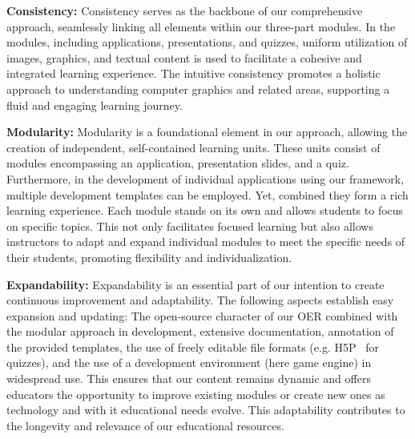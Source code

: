 \textbf{Consistency:}
Consistency serves as the backbone of our comprehensive approach, seamlessly linking all elements within our three-part modules. In the modules, including applications, presentations, and quizzes, uniform utilization of images, graphics, and textual content is used to facilitate a cohesive and integrated learning experience. The intuitive consistency promotes a holistic approach to understanding computer graphics and related areas, supporting a fluid and engaging learning journey.

\textbf{Modularity:}
Modularity is a foundational element in our approach, allowing the creation of independent, self-contained learning units. These units consist of modules encompassing an application, presentation slides, and a quiz. Furthermore, in the development of individual applications using our framework, multiple development templates can be employed. Yet, combined they form a rich learning experience. Each module stands on its own and allows students to focus on specific topics. This not only facilitates focused learning but also allows instructors to adapt and expand individual modules to meet the specific needs of their students, promoting flexibility and individualization.

\textbf{Expandability:}
Expandability is an essential part of our intention to create continuous improvement and adaptability. The following aspects establish easy expansion and updating: The open-source character of our OER combined with the modular approach in development, extensive documentation, annotation of the provided templates, the use of freely editable file formats (e.g. H5P~\cite{Singleton_Charlton_2019} for quizzes), and the use of a development environment (here game engine) in widespread use. This ensures that our content remains dynamic and offers educators the opportunity to improve existing modules or create new ones as technology and with it educational needs evolve. This adaptability contributes to the longevity and relevance of our educational resources.

